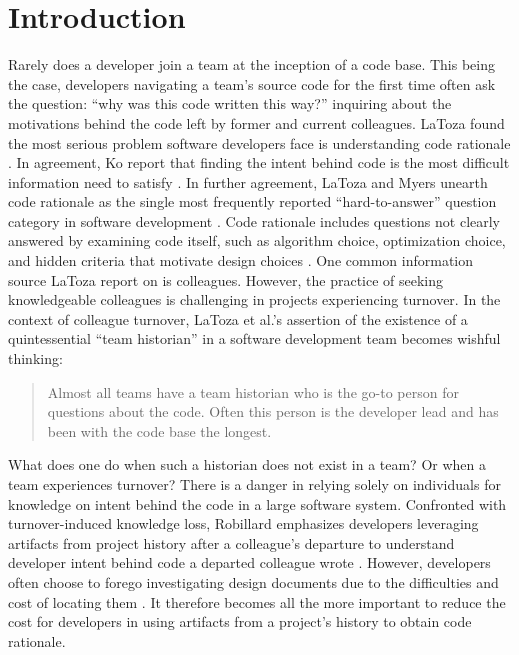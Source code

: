
\chapter{Introduction}
\label{ch:Introduction}


Rarely does a developer join a team at the inception of a code base. 
This being the case, developers navigating a team's source code for the first time often ask the question: ``why was this code written this way?'' inquiring about the motivations behind the code left by former and current colleagues.
LaToza \etal found the most serious problem software developers face is understanding code rationale \cite{latoza_maintaining_2006}.
In agreement, Ko \etal report that finding the intent behind code is the most difficult information need to satisfy \cite{ko_information_2007}. 
In further agreement, LaToza and Myers unearth code rationale as the single most frequently reported “hard-to-answer” question category in software development \cite{latoza_hard-answer_2010}. 
Code rationale includes questions not clearly answered by examining code itself, such as algorithm choice, optimization choice, and hidden criteria that motivate design choices \cite{latoza_hard-answer_2010}. 
One common information source LaToza \etal report on is colleagues. 
However, the practice of seeking knowledgeable colleagues is challenging in projects experiencing turnover. 
In the context of colleague turnover, LaToza et al.'s assertion of the existence of a quintessential ``team historian'' in a software development team \cite{latoza_maintaining_2006} becomes wishful thinking:

\begin{quote}
Almost all teams have a team historian who is the go-to person for questions about the
code. Often this person is the developer lead and has been with the code base the longest.
\end{quote}

What does one do when such a historian does not exist in a team? Or when a team experiences turnover?
There is a danger in relying solely on individuals for knowledge on intent behind the code in a large software system.
Confronted with turnover-induced knowledge loss, Robillard emphasizes developers leveraging artifacts from project history after a colleague’s departure to understand developer intent behind code a departed colleague wrote \cite{robillard_turnover-induced_2021}. 
However, developers often choose to forego investigating design documents due to the difficulties and cost of locating them \cite{latoza_maintaining_2006}.
It therefore becomes all the more important to reduce the cost for developers in using artifacts from a project's history to obtain code rationale. 

